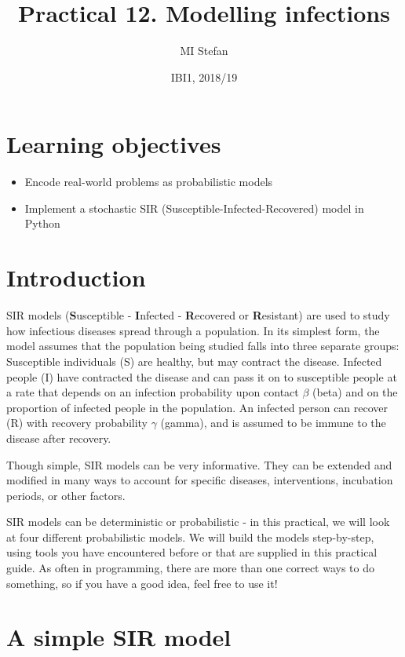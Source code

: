 \documentclass[pdflatex,a4paper]{article}
\title{Practical 12. Modelling infections}
\author{MI Stefan}
\date{IBI1, 2018/19}
\begin{document}
\newcommand{\<}{\textless}
\renewcommand{\>}{\textgreater}


\maketitle

\section{Learning objectives}


\begin{itemize}
\item
Encode real-world problems as probabilistic models	
\item
Implement a stochastic SIR (Susceptible-Infected-Recovered) model in Python
\end{itemize}

\section{Introduction}

SIR models (\textbf{S}usceptible - \textbf{I}nfected - \textbf{R}ecovered or \textbf{R}esistant) are used to study how infectious diseases spread through a population. In its simplest form, the model assumes that the population being studied falls into three separate groups: Susceptible individuals (S) are healthy, but may contract the disease. Infected people (I) have contracted the disease and can pass it on to susceptible people at a rate that depends on an infection probability upon contact \(\beta\) (beta) and on the proportion of infected people in the population. An infected person can recover (R) with recovery probability \(\gamma\) (gamma), and is assumed to be immune to the disease after recovery.  

Though simple, SIR models can be very informative. They can be extended and modified in many ways to account for specific diseases, interventions, incubation periods, or other factors. 

SIR models can be deterministic or probabilistic - in this practical, we will look at four different probabilistic models. We will build the models step-by-step, using tools you have encountered before or that are supplied in this practical guide. As often in programming, there are more than one correct ways to do something, so if you have a good idea, feel free to use it!


\section{A simple SIR model}
\end{document}
